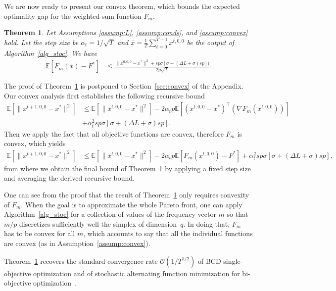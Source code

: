 \documentclass[11pt,a4paper]{article}
\numberwithin{equation}{section}%
\newtheorem{theorem}{Theorem}[section]
\renewcommand{\(}{\left (}
\renewcommand{\)}{\right )}
\newcommand{\diam}{\Delta}
\newcommand{\Lphif}{L}
\newcommand{\Fm}{F_m}
\begin{document}
We are now ready to present our convex theorem, which bounds the expected optimality gap for the weighted-sum function $F_m$. 
\begin{theorem}
\label{thm:convex}
Let Assumptions \ref{assump:L}, \ref{assump:conds}, and \ref{assump:convex} hold. Let the step size be $\alpha_t = {1}/{\sqrt{T}}$ and 
$\bar{x} = \frac{1}{T}\sum_{t=0}^{T-1} x^{t,0,0}$ be the output of Algorithm~\ref{alg_stoc}.
We have
\begin{align*}
 \mathbb{E}[\Fm(\bar{x}) - F^*] 
    &\leq \frac{\|x^{0,0,0}- x^*\|^2 + sp \sigma[\sigma+  (\diam \Lphif +  \sigma) sp])}{2p\sqrt{T}}  . 
\end{align*}

\end{theorem}
The proof of Theorem~\ref{thm:convex} is postponed to  Section~\ref{sec:convex} of the Appendix. 
Our convex analysis first establishes the following recursive bound
\begin{align*}
\mathbb{E}[\|x^{t+1,0,0} - x^*\|^2]
    &\leq \mathbb{E}[\|x^{t,0,0}- x^*\|^2]- 2\alpha_t p\mathbb{E}[(x^{t,0,0}- x^*)^\top(\nabla \Fm(x^{t,0,0}) )]\\
    &+ \alpha^2_t sp \sigma[\sigma+  (\diam \Lphif +  \sigma) sp].
\end{align*}
Then we apply the fact that all objective functions are convex, therefore $\Fm$ is convex, which yields
\begin{align*}
\mathbb{E}[\|x^{t+1,0,0} - x^*\|^2]
    &\leq \mathbb{E}[\|x^{t,0,0}- x^*\|^2] - 2\alpha_t p\mathbb{E}[\Fm(x^{t,0,0}) - F^*] + \alpha^2_t sp \sigma[\sigma+  (\diam \Lphif +  \sigma) sp],
\end{align*}
from where we obtain the final bound of Theorem~\ref{thm:convex} by applying a fixed step size and averaging the derived recursive bound.

One can see from the proof that the result of Theorem~\ref{thm:convex} only requires convexity of $\Fm$. When the goal is to approximate the whole Pareto front, one can apply Algorithm~\ref{alg_stoc} for a collection of values of the frequency vector $m$ so that $m/p$ discretizes sufficiently well the simplex of dimension~$q$. In doing that, $\Fm$ has to be convex for all $m$, which accounts to say that all the individual functions are convex (as in Assumption~\ref{assump:convex}). 

Theorem~\ref{thm:convex} recovers the standard convergence rate $\mathcal{O}(1/T^{1/2})$ of BCD single-objective optimization \cite{ghadimi2013stochastic, xu2015blockstochasticgradientiteration} and of stochastic alternating function minimization for 
bi-objective optimization~\cite{SLiu_LNVicente_2019}. 
\end{document}
